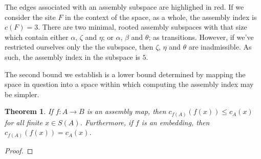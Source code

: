 \documentclass[aps,prd,onecolumn,nofootinbib,letterpaper,preprintnumbers,superscriptaddress,eqsecnum]{revtex4}
\newtheorem{theorem}{Theorem}
\theoremstyle{definition}
\newcommand{\red}[1]{{\color{red}#1}}
\newcommand{\TODO}[1]{\noindent\red{\textbf{TODO:}~#1}}
\begin{document}
\begin{center}
{
    }
\end{center}
The edges associated with an assembly subspace are highlighed in red.
If we consider the site $F$ in the context of the space, as a whole, the assembly index is $c(F) = 3$.
There are two minimal, rooted assembly subspaces with that size which contain either $\alpha$, $\zeta$ and $\eta$; or $\alpha$, $\beta$ and $\theta$; as transitions.
However, if we've restricted ourselves only the the subspace, then $\zeta$, $\eta$ and $\theta$ are inadmissible.
As such, the assembly index in the subspace is $5$.

The second bound we establish is a lower bound determined by mapping the space in question into a space within which computing the assembly index may be simpler.
\begin{theorem}\label{thm:image-lower-bound}
    If $f: A \rightarrow B$ is an assembly map, then $c_{f(A)}(f(x)) \le c_A(x)$ for all finite $x \in S(A)$.
    Furthermore, if $f$ is an embedding, then $c_{f(A)}(f(x)) = c_A(x)$.
\end{theorem}
\begin{proof}
    \TODO{Complete}
\end{proof}
\end{document}
